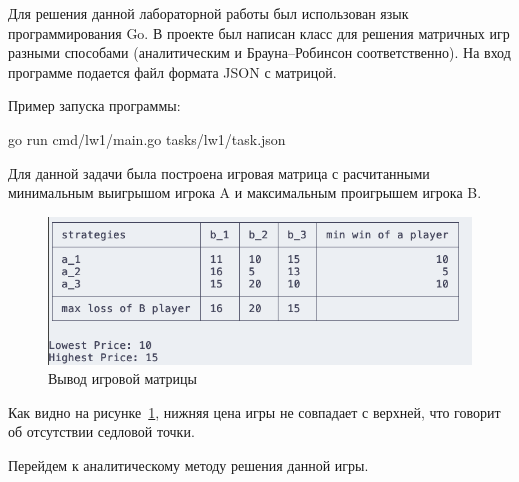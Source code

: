 
Для решения данной лабораторной работы был использован язык программирования Go.
В проекте был написан класс для решения матричных игр разными способами (аналитическим
и Брауна--Робинсон соответственно). На вход программе подается файл формата JSON с матрицой.

Пример запуска программы:

\begin{codelisting}[language=Bash]
    go run cmd/lw1/main.go tasks/lw1/task.json
\end{codelisting}

Для данной задачи была построена игровая матрица с расчитанными минимальным выигрышом игрока
A и максимальным проигрышем игрока B.

\begin{figure}
  \centering
  \includegraphics[scale=0.7]{../../artifacts/lw1/game_matrix.png}
  \caption{Вывод игровой матрицы}
  \label{fig:fig01}
\end{figure}

Как видно на рисунке~\ref{fig:fig01}, нижняя цена игры не совпадает с верхней, что говорит об
отсутствии седловой точки.

Перейдем к аналитическому методу решения данной игры.
